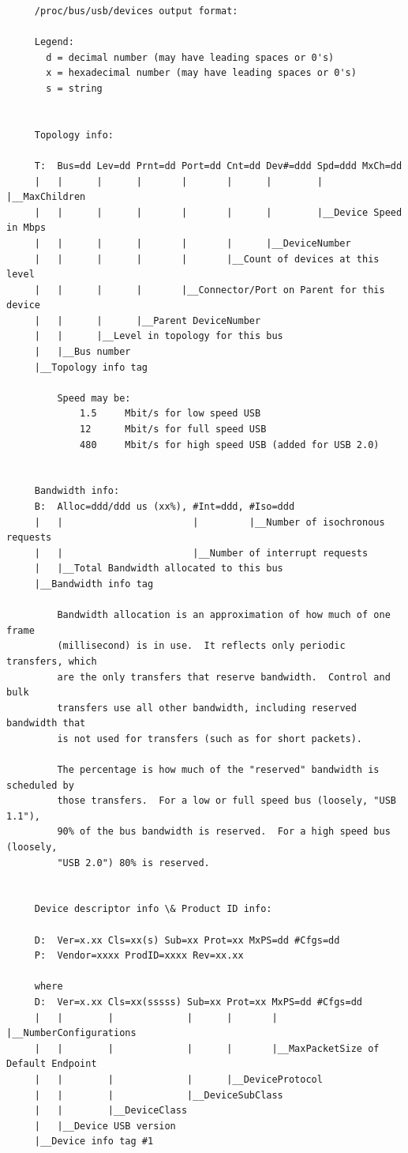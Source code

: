 {{{{{{{{{{{{{{{{{\begin{verbatim}
     /proc/bus/usb/devices output format:
     
     Legend:
       d = decimal number (may have leading spaces or 0's)
       x = hexadecimal number (may have leading spaces or 0's)
       s = string
     
     
     Topology info:
     
     T:  Bus=dd Lev=dd Prnt=dd Port=dd Cnt=dd Dev#=ddd Spd=ddd MxCh=dd
     |   |      |      |       |       |      |        |       |__MaxChildren
     |   |      |      |       |       |      |        |__Device Speed in Mbps
     |   |      |      |       |       |      |__DeviceNumber
     |   |      |      |       |       |__Count of devices at this level
     |   |      |      |       |__Connector/Port on Parent for this device
     |   |      |      |__Parent DeviceNumber
     |   |      |__Level in topology for this bus
     |   |__Bus number
     |__Topology info tag
     
         Speed may be:
             1.5     Mbit/s for low speed USB
             12      Mbit/s for full speed USB
             480     Mbit/s for high speed USB (added for USB 2.0)
     
     
     Bandwidth info:
     B:  Alloc=ddd/ddd us (xx%), #Int=ddd, #Iso=ddd
     |   |                       |         |__Number of isochronous requests
     |   |                       |__Number of interrupt requests
     |   |__Total Bandwidth allocated to this bus
     |__Bandwidth info tag
     
         Bandwidth allocation is an approximation of how much of one frame
         (millisecond) is in use.  It reflects only periodic transfers, which
         are the only transfers that reserve bandwidth.  Control and bulk
         transfers use all other bandwidth, including reserved bandwidth that
         is not used for transfers (such as for short packets).
     
         The percentage is how much of the "reserved" bandwidth is scheduled by
         those transfers.  For a low or full speed bus (loosely, "USB 1.1"),
         90% of the bus bandwidth is reserved.  For a high speed bus (loosely,
         "USB 2.0") 80% is reserved.
     
     
     Device descriptor info \& Product ID info:
     
     D:  Ver=x.xx Cls=xx(s) Sub=xx Prot=xx MxPS=dd #Cfgs=dd
     P:  Vendor=xxxx ProdID=xxxx Rev=xx.xx
     
     where
     D:  Ver=x.xx Cls=xx(sssss) Sub=xx Prot=xx MxPS=dd #Cfgs=dd
     |   |        |             |      |       |       |__NumberConfigurations
     |   |        |             |      |       |__MaxPacketSize of Default Endpoint
     |   |        |             |      |__DeviceProtocol
     |   |        |             |__DeviceSubClass
     |   |        |__DeviceClass
     |   |__Device USB version
     |__Device info tag #1
     

\end{verbatim}}}}}}}}}}}}}}}}}}
